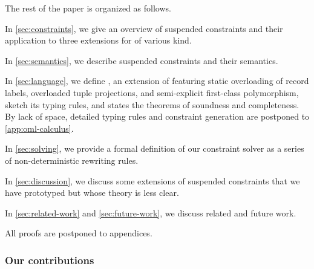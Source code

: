 \documentclass[acmsmall,screen,nonacm,review]{acmart}
\begin{document}
The rest of the paper is organized as follows.
\begin{enumerate*}[label={}]

\item
  In \cref{sec:constraints}, we give an overview of suspended constraints
  and their application to three extensions for \ML of various kind.

\item
  In \cref{sec:semantics}, we describe suspended constraints and their semantics.

\item
  In \cref{sec:language}, we define \OML, an extension of \ML featuring static
  overloading of record labels, overloaded tuple projections, and
  semi-explicit first-class polymorphism, sketch its typing rules,
  and states the theorems of soundness and completeness.
  By lack of space, detailed typing rules and constraint generation are
  postponed to \cref {app:oml-calculus}.

\item
  In \cref{sec:solving}, we provide a formal definition of our constraint
  solver as a series of non-deterministic rewriting rules.

\item
  In \cref{sec:discussion}, we discuss some extensions of suspended
  constraints that we have prototyped but whose theory is less clear.

\item
  In \cref{sec:related-work} and \cref{sec:future-work}, we discuss related
  and future work.

\end{enumerate*}
All proofs are postponed to appendices.

\subsubsection* {Our contributions}
\end{document}
